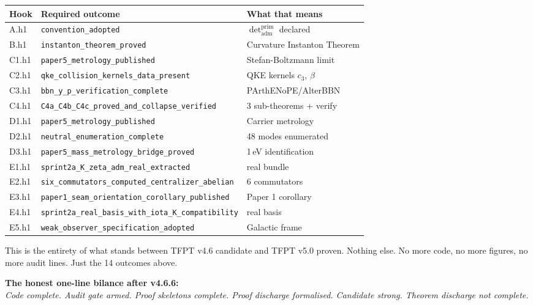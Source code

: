 \documentclass[11pt,a4paper]{article}
\begin{document}
\begin{center}\small
\begin{tabular}{@{}lll@{}}
\toprule
\textbf{Hook} & \textbf{Required outcome} & \textbf{What that means} \\
\midrule
A.h1 & \texttt{convention\_adopted} & \(\det_{\mathrm{adm}}^{\mathrm{prim}}\) declared \\
B.h1 & \texttt{instanton\_theorem\_proved} & Curvature Instanton Theorem \\
C1.h1 & \texttt{paper5\_metrology\_published} & Stefan-Boltzmann limit \\
C2.h1 & \texttt{qke\_collision\_kernels\_data\_present} & QKE kernels \(c_3\), \(\beta\) \\
C3.h1 & \texttt{bbn\_y\_p\_verification\_complete} & PArthENoPE/AlterBBN \\
C4.h1 & \texttt{C4a\_C4b\_C4c\_proved\_and\_collapse\_verified} & 3 sub-theorems + verify \\
D1.h1 & \texttt{paper5\_metrology\_published} & Carrier metrology \\
D2.h1 & \texttt{neutral\_enumeration\_complete} & 48 modes enumerated \\
D3.h1 & \texttt{paper5\_mass\_metrology\_bridge\_proved} & 1\,eV identification \\
E1.h1 & \texttt{sprint2a\_K\_zeta\_adm\_real\_extracted} & real bundle \\
E2.h1 & \texttt{six\_commutators\_computed\_centralizer\_abelian} & 6 commutators \\
E3.h1 & \texttt{paper1\_seam\_orientation\_corollary\_published} & Paper 1 corollary \\
E4.h1 & \texttt{sprint2a\_real\_basis\_with\_iota\_K\_compatibility} & real basis \\
E5.h1 & \texttt{weak\_observer\_specification\_adopted} & Galactic frame \\
\bottomrule
\end{tabular}
\end{center}

This is the entirety of what stands between TFPT v4.6 candidate and
TFPT v5.0 proven.  Nothing else.  No more code, no more figures, no
more audit lines.  Just the 14 outcomes above.

\begin{tfptfrontbox}
\textbf{The honest one-line bilance after v4.6.6:}\\
\emph{Code complete. Audit gate armed. Proof skeletons complete.
Proof discharge formalised. Candidate strong. Theorem discharge not
complete.}
\end{tfptfrontbox}
\end{document}
